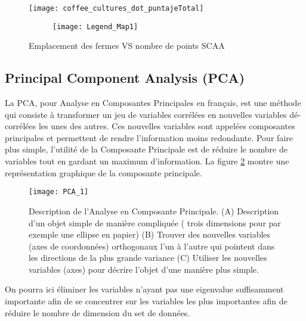 \begin{figure}[H]
	\texttt{[image: coffee\_cultures\_dot\_puntajeTotal]}
	\begin{figure}[H]
		\texttt{[image: Legend\_Map1]}
	\end{figure}
	\caption{\label{FincaVSPoints} Emplacement des fermes VS nombre de points SCAA}
\end{figure}








\newpage
\subsection{Principal Component Analysis (PCA)}\label{PCAss}
La PCA, pour Analyse en Composantes Principales en français, est une méthode qui consiste à transformer un jeu de variables corrélées en nouvelles variables dé-corrélées les unes des autres. Ces nouvelles variables sont appelées composantes principales et permettent de rendre l'information moins redondante. Pour faire plus simple, l'utilité de la Composante Principale est de réduire le nombre de variables tout en gardant un maximum d'information. La figure \ref{PCAdefinition} montre une représentation graphique de la composante principale. 


\begin{figure}[H]
	\texttt{[image: PCA\_1]}
	\caption{\label{PCAdefinition} Description de l'Analyse en Composante Principale. (A) Description d'un objet simple de manière compliquée ( trois dimensions pour par exemple une ellipse en papier) (B) Trouver des nouvelles variables (axes de coordonnées) orthogonaux l'un à l'autre qui pointent dans les directions de la plus grande variance (C) Utiliser les nouvelles variables (axes) pour décrire l'objet d'une manière plus simple. }
\end{figure}

\noindent On pourra ici éliminer les variables n'ayant pas une eigenvalue suffisamment importante afin de se concentrer sur les variables les plus importantes afin de réduire le nombre de dimension du set de données. 




